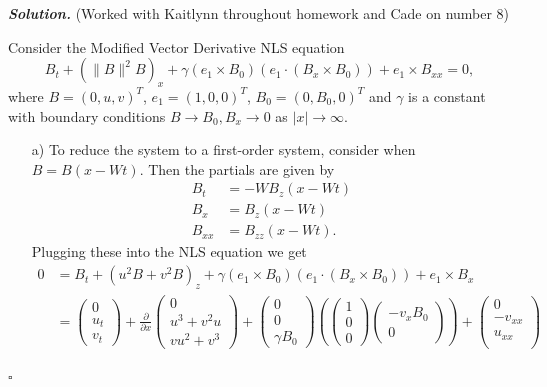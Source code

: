\documentclass[12pt]{report}
\newenvironment{solution}[1][\it{Solution}]{\textbf{#1. } }{$\square$}
\newcommand{\paren}[1]{{\left(#1\right)}} %
\newcommand{\pp}[2]{\frac{\partial #1}{\partial #2}} %
\begin{document}
\begin{solution}
    (Worked with Kaitlynn throughout homework and Cade on number 8)

    \noindent
    Consider the Modified Vector Derivative NLS equation
    \[ 
        B_t+(\|B\|^2B)_x+\gamma (e_1\times B_0)\left(e_1\cdot (B_x\times B_0)\right)+e_1\times B_{xx}=0,
    \]
    where $B = (0,u,v)^T$, $e_1 = (1,0,0)^T$, $B_0 = (0, B_0, 0)^T$ and $\gamma$ is a constant with boundary conditions $B \to B_0, B_x \to 0$ as $|x| \to \infty$. 
    
    \begin{enumerate}
        \item [a)]
        To reduce the system to a first-order system, consider when $B = B(x-Wt)$. Then the partials are given by
        \begin{align*}
            B_t &= -WB_z(x - Wt)\\
            B_x &= B_z(x - Wt)\\
            B_{xx} &= B_{zz}(x - Wt).
        \end{align*}
        Plugging these into the NLS equation we get
        \begin{align*}
            0 &= B_t + (u^2B + v^2B)_z + \gamma(e_1 \times B_0)(e_1 \cdot (B_x \times B_0)) + e_1 \times B_x\\
            &=\begin{pmatrix}
                0\\u_t\\v_t
            \end{pmatrix} + \pp{}{x}\begin{pmatrix}
                0\\u^3 + v^2 u\\vu^2+v^3
            \end{pmatrix} + \begin{pmatrix}
                0\\0\\\gamma B_0
            \end{pmatrix}\paren{\begin{pmatrix}
                1\\0\\0
            \end{pmatrix}\begin{pmatrix}
                -v_xB_0\\0
            \end{pmatrix}} + \begin{pmatrix}
                0\\-v_{xx}\\u_{xx}\\

\end{pmatrix}
\end{align*}
\end{enumerate}
\end{solution}
\end{document}
